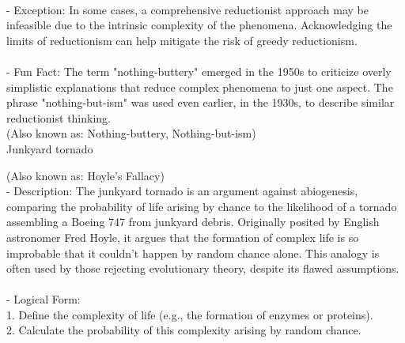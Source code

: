 \documentclass[a4paper,12pt,single,pdftex]{scrbook}
\begin{document}
    
      
    \\

    
      - Exception: In some cases, a comprehensive reductionist approach may be infeasible due to the intrinsic complexity of the phenomena. Acknowledging the limits of reductionism can help mitigate the risk of greedy reductionism.
    \\

    
      
    \\

    
      - Fun Fact: The term "nothing-buttery" emerged in the 1950s to criticize overly simplistic explanations that reduce complex phenomena to just one aspect. The phrase "nothing-but-ism" was used even earlier, in the 1930s, to describe similar reductionist thinking.
    \\

  
    
      (Also known as: Nothing-buttery, Nothing-but-ism)
    \\

  

Junkyard tornado
    
      (Also known as: Hoyle's Fallacy)
    \\

  
    
      - Description: The junkyard tornado is an argument against abiogenesis, comparing the probability of life arising by chance to the likelihood of a tornado assembling a Boeing 747 from junkyard debris. Originally posited by English astronomer Fred Hoyle, it argues that the formation of complex life is so improbable that it couldn't happen by random chance alone. This analogy is often used by those rejecting evolutionary theory, despite its flawed assumptions.
    \\

    
      
    \\

    
      - Logical Form:
    \\

    
        1. Define the complexity of life (e.g., the formation of enzymes or proteins).
    \\

    
        2. Calculate the probability of this complexity arising by random chance.
    \\
\end{document}

